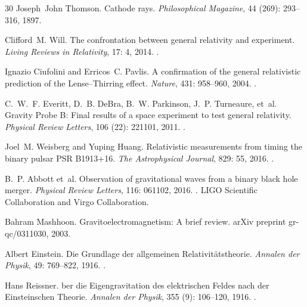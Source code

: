 \documentclass[11pt,a4paper]{article}
\theoremstyle{plain}
\theoremstyle{definition}
\theoremstyle{remark}
\begin{document}
\begin{thebibliography}{30}
Joseph~John Thomson.
\newblock Cathode rays.
\newblock \emph{Philosophical Magazine}, 44 (269): 293--316,
  1897.

Clifford~M. Will.
\newblock The confrontation between general relativity and experiment.
\newblock \emph{Living Reviews in Relativity}, 17: 4, 2014.
\newblock {}.

Ignazio Ciufolini and Erricos~C. Pavlis.
\newblock A confirmation of the general relativistic prediction of the
  {L}ense--{T}hirring effect.
\newblock \emph{Nature}, 431: 958--960, 2004.
\newblock {}.

C.~W.~F. Everitt, D.~B. DeBra, B.~W. Parkinson, J.~P. Turneaure, et~al.
\newblock Gravity {P}robe {B}: Final results of a space experiment to test
  general relativity.
\newblock \emph{Physical Review Letters}, 106 (22): 221101,
  2011.
\newblock {}.

Joel~M. Weisberg and Yuping Huang.
\newblock Relativistic measurements from timing the binary pulsar {PSR}
  {B1913+16}.
\newblock \emph{The Astrophysical Journal}, 829: 55, 2016.
\newblock {}.

B.~P. Abbott et~al.
\newblock Observation of gravitational waves from a binary black hole merger.
\newblock \emph{Physical Review Letters}, 116: 061102, 2016.
\newblock {}.
\newblock LIGO Scientific Collaboration and Virgo Collaboration.

Bahram Mashhoon.
\newblock Gravitoelectromagnetism: A brief review.
\newblock arXiv preprint gr-qc/0311030, 2003.

Albert Einstein.
\newblock Die {G}rundlage der allgemeinen {R}elativit{\"a}tstheorie.
\newblock \emph{Annalen der Physik}, 49: 769--822, 1916.
\newblock {}.

Hans Reissner.
ber die {E}igengravitation des elektrischen {F}eldes nach der
  {E}insteinschen {T}heorie.
\newblock \emph{Annalen der Physik}, 355 (9): 106--120, 1916.
\newblock {}.


\end{thebibliography}
\end{document}
